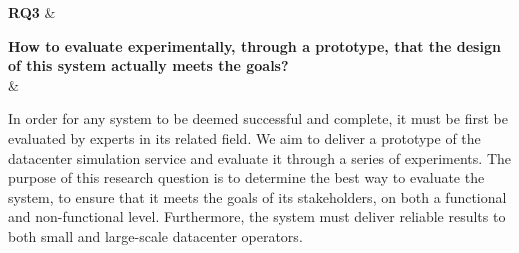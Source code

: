
\textbf{RQ3} \label{question:rq3} &

\textbf{How to evaluate experimentally, through a prototype, that the design of this system actually meets the goals?}
\\&

In order for any system to be deemed successful and complete, it must be first be evaluated by experts in its related field.
We aim to deliver a prototype of the datacenter simulation service and evaluate it through a series of experiments.
The purpose of this research question is to determine the best way to evaluate the system, to ensure that it meets the goals of its stakeholders, on both a functional and non-functional level.
Furthermore, the system must deliver reliable results to both small and large-scale datacenter operators.
\\\\